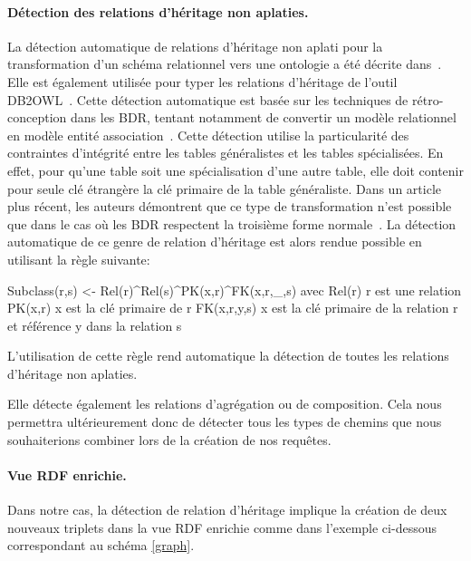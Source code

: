 \paragraph*{Détection des relations d'héritage non aplaties.}

La détection automatique de relations d'héritage non aplati pour la transformation d’un schéma relationnel vers une ontologie a été décrite dans~\cite{tirmizi_2008}. Elle est également utilisée pour typer les relations d'héritage de l’outil DB2OWL~\cite{Cullot2007}. Cette détection automatique est basée sur les techniques de rétro-conception dans les BDR, tentant notamment de convertir un modèle relationnel en modèle entité association~\cite{Davis1987}. Cette détection utilise la particularité des contraintes d'intégrité entre les tables généralistes et les tables spécialisées. En effet, pour qu'une table soit une spécialisation d'une autre table, elle doit contenir pour seule clé étrangère la clé primaire de la table généraliste. Dans un article plus récent, les auteurs démontrent que ce type de transformation n’est possible que dans le cas où les BDR respectent la troisième forme normale~\cite{Sequeda2006}. La détection automatique de ce genre de relation d'héritage est alors rendue possible en utilisant la règle suivante:

\begin{verbatimtab}
Subclass(r,s) <- Rel(r)^Rel(s)^PK(x,r)^FK(x,r,_,s)
avec
Rel(r)	r est une relation
PK(x,r)	x est la clé primaire de r
FK(x,r,y,s) x est la clé primaire de la relation r 
	et référence y dans la relation s
\end{verbatimtab}

L'utilisation de cette règle rend automatique la détection de toutes les relations d'héritage non aplaties. 

Elle détecte également les relations d'agrégation ou de composition.
Cela nous permettra ultérieurement donc de détecter tous les types de chemins que nous souhaiterions combiner lors de la création de nos requêtes.

\paragraph*{Vue RDF enrichie.}
Dans notre cas, la détection de relation d'héritage implique la création de deux nouveaux triplets dans la vue RDF enrichie comme dans l'exemple ci-dessous correspondant au schéma \ref{graph}. 

